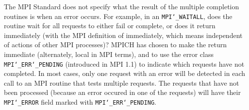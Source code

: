 The MPI Standard does not specify what the result of the multiple
completion routines is when an error occurs.  For example, in an
{\tt MPI{\tt \char`\_}WAITALL}, does the routine wait for all requests to either fail or
complete, or does it return immediately (with the MPI definition of
immediately, which means independent of actions of other MPI processes)?
MPICH has chosen to make the return immediate (alternately, local in MPI
terms), and to use the error class {\tt MPI{\tt \char`\_}ERR{\tt \char`\_}PENDING} (introduced in MPI 1.1)
to indicate which requests have not completed.  In most cases, only
one request with an error will be detected in each call to an MPI routine
that tests multiple requests.  The requests that have not been processed
(because an error occured in one of the requests) will have their
{\tt MPI{\tt \char`\_}ERROR} field marked with {\tt MPI{\tt \char`\_}ERR{\tt \char`\_}PENDING}.
\par
{}
\endmanpage
